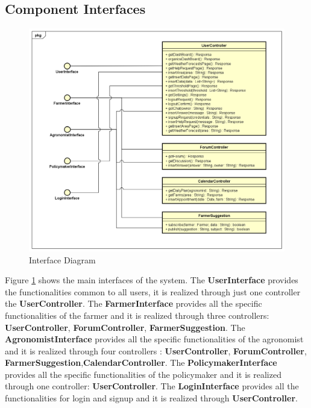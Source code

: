 \subsection{Component Interfaces}
\begin{figure}[H]
    \includegraphics[width=\textwidth,height=\textheight,keepaspectratio]{Images/InterfaceDiagram.png}
    \caption{Interface Diagram}
    \label{fig:interface_diagram}
\end{figure}
Figure \ref{fig:interface_diagram} shows the main interfaces of the system.\newline
The \textbf{UserInterface} provides the functionalities common to all users, it is realized through just one controller the \textbf{UserController}. \newline
The \textbf{FarmerInterface} provides all the specific functionalities of the farmer and it is realized through three controllers: \textbf{UserController}, \textbf{ForumController}, \textbf{FarmerSuggestion}.\newline
The \textbf{AgronomistInterface} provides all the specific functionalities of the agronomist and it is realized through four controllers     :
\textbf{UserController}, \textbf{ForumController}, \textbf{FarmerSuggestion},\textbf{CalendarController}.\newline
The \textbf{PolicymakerInterface} provides all the specific functionalities of the policymaker and it is realized through one controller:
\textbf{UserController}.\newline
The \textbf{LoginInterface} provides all the functionalities for login and signup and it is realized through \textbf{UserController}.


